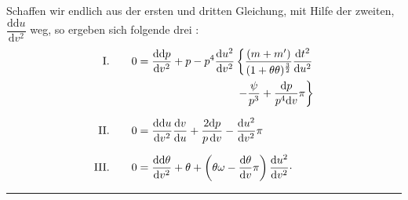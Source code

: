 \par\noindent Schaffen wir endlich aus der ersten und dritten Gleichung, mit Hilfe der
zweiten, \(\dfrac{\mathrm{dd}u}{\mathrm{d}v^2}\) weg, so ergeben sich folgende drei
:
\[
\begin{aligned}
\mathrm{I.}\qquad0&=\frac{\mathrm{dd}p}{\mathrm{d}v^2}+p
 -p^4\frac{\mathrm{d}u^2}{\mathrm{d}v^2}
 \left\{\frac{(m+m')}{(1+\theta\theta)^{\frac{3}{2}}}
 \frac{\mathrm{d}t^2}{\mathrm{d}u^2}\right.\\
 &\hspace{9em}\left.-\frac{\psi}{p^3}
 +\frac{\mathrm{d}p}{p^4\mathrm{d}v}\pi\right\}\\[6pt]
\mathrm{II.}\qquad0&=\frac{\mathrm{dd}u}{\mathrm{d}v^2}\frac{\mathrm{d}v}{\mathrm{d}u}
 +\frac{2\mathrm{d}p}{p\,\mathrm{d}v}
 -\frac{\mathrm{d}u^2}{\mathrm{d}v^2}\pi\\[6pt]
\mathrm{III.}\qquad0&=\frac{\mathrm{dd}\theta}{\mathrm{d}v^2}+\theta
 +\left(\theta\omega-\frac{\mathrm{d}\theta}{\mathrm{d}v}\pi\right)
 \frac{\mathrm{d}u^2}{\mathrm{d}v^2}\mathpunct{\raisebox{.4ex}{.}}
\end{aligned}
\]
\begin{center}\rule{.9in}{.35pt}\end{center}
\clearpage
\endgroup
